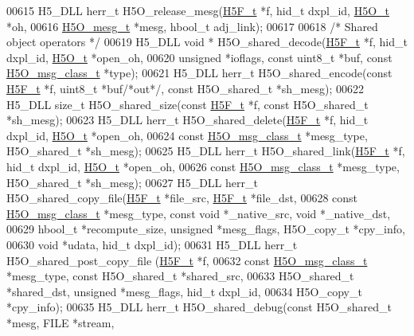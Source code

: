 \begin{DoxyCode}
00615 H5\_DLL herr\_t H5O\_release\_mesg(\hyperlink{struct_h5_f__t}{H5F\_t} *f, hid\_t dxpl\_id, \hyperlink{struct_h5_o__t}{H5O\_t} *oh,
00616     \hyperlink{struct_h5_o__mesg__t}{H5O\_mesg\_t} *mesg, hbool\_t adj\_link);
00617 
00618 \textcolor{comment}{/* Shared object operators */}
00619 H5\_DLL \textcolor{keywordtype}{void} * H5O\_shared\_decode(\hyperlink{struct_h5_f__t}{H5F\_t} *f, hid\_t dxpl\_id, \hyperlink{struct_h5_o__t}{H5O\_t} *open\_oh,
00620     \textcolor{keywordtype}{unsigned} *ioflags, \textcolor{keyword}{const} uint8\_t *buf, \textcolor{keyword}{const} \hyperlink{struct_h5_o__msg__class__t}{H5O\_msg\_class\_t} *type);
00621 H5\_DLL herr\_t H5O\_shared\_encode(\textcolor{keyword}{const} \hyperlink{struct_h5_f__t}{H5F\_t} *f, uint8\_t *buf\textcolor{comment}{/*out*/}, \textcolor{keyword}{const} H5O\_shared\_t *sh\_mesg);
00622 H5\_DLL \textcolor{keywordtype}{size\_t} H5O\_shared\_size(\textcolor{keyword}{const} \hyperlink{struct_h5_f__t}{H5F\_t} *f, \textcolor{keyword}{const} H5O\_shared\_t *sh\_mesg);
00623 H5\_DLL herr\_t H5O\_shared\_delete(\hyperlink{struct_h5_f__t}{H5F\_t} *f, hid\_t dxpl\_id, \hyperlink{struct_h5_o__t}{H5O\_t} *open\_oh,
00624     \textcolor{keyword}{const} \hyperlink{struct_h5_o__msg__class__t}{H5O\_msg\_class\_t} *mesg\_type, H5O\_shared\_t *sh\_mesg);
00625 H5\_DLL herr\_t H5O\_shared\_link(\hyperlink{struct_h5_f__t}{H5F\_t} *f, hid\_t dxpl\_id, \hyperlink{struct_h5_o__t}{H5O\_t} *open\_oh,
00626     \textcolor{keyword}{const} \hyperlink{struct_h5_o__msg__class__t}{H5O\_msg\_class\_t} *mesg\_type, H5O\_shared\_t *sh\_mesg);
00627 H5\_DLL herr\_t H5O\_shared\_copy\_file(\hyperlink{struct_h5_f__t}{H5F\_t} *file\_src, \hyperlink{struct_h5_f__t}{H5F\_t} *file\_dst,
00628     \textcolor{keyword}{const} \hyperlink{struct_h5_o__msg__class__t}{H5O\_msg\_class\_t} *mesg\_type, \textcolor{keyword}{const} \textcolor{keywordtype}{void} *\_native\_src, \textcolor{keywordtype}{void} *\_native\_dst,
00629     hbool\_t *recompute\_size, \textcolor{keywordtype}{unsigned} *mesg\_flags, H5O\_copy\_t *cpy\_info,
00630     \textcolor{keywordtype}{void} *udata, hid\_t dxpl\_id);
00631 H5\_DLL herr\_t H5O\_shared\_post\_copy\_file (\hyperlink{struct_h5_f__t}{H5F\_t} *f,
00632     \textcolor{keyword}{const} \hyperlink{struct_h5_o__msg__class__t}{H5O\_msg\_class\_t} *mesg\_type, \textcolor{keyword}{const} H5O\_shared\_t *shared\_src,
00633     H5O\_shared\_t *shared\_dst, \textcolor{keywordtype}{unsigned} *mesg\_flags, hid\_t dxpl\_id,
00634     H5O\_copy\_t *cpy\_info);
00635 H5\_DLL herr\_t H5O\_shared\_debug(\textcolor{keyword}{const} H5O\_shared\_t *mesg, FILE *stream,

\end{DoxyCode}

